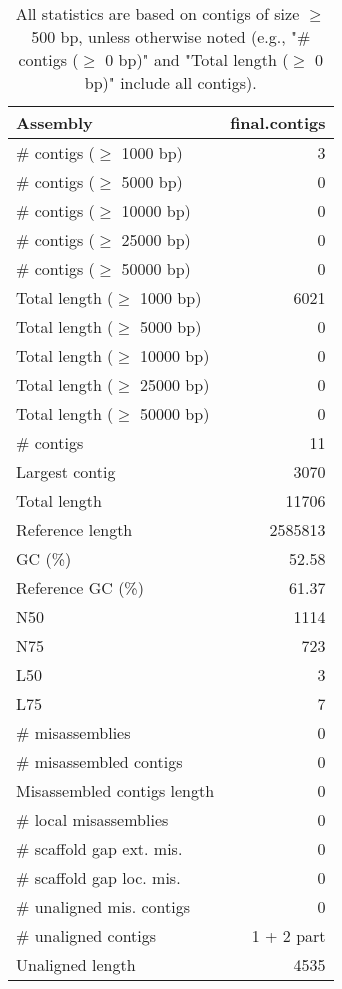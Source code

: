 \documentclass[12pt,a4paper]{article}
\begin{document}
\begin{table}[ht]
\begin{center}
\caption{All statistics are based on contigs of size $\geq$ 500 bp, unless otherwise noted (e.g., "\# contigs ($\geq$ 0 bp)" and "Total length ($\geq$ 0 bp)" include all contigs).}
\begin{tabular}{|l*{1}{|r}|}
\hline
Assembly & final.contigs \\ \hline
\# contigs ($\geq$ 1000 bp) & 3 \\ \hline
\# contigs ($\geq$ 5000 bp) & 0 \\ \hline
\# contigs ($\geq$ 10000 bp) & 0 \\ \hline
\# contigs ($\geq$ 25000 bp) & 0 \\ \hline
\# contigs ($\geq$ 50000 bp) & 0 \\ \hline
Total length ($\geq$ 1000 bp) & 6021 \\ \hline
Total length ($\geq$ 5000 bp) & 0 \\ \hline
Total length ($\geq$ 10000 bp) & 0 \\ \hline
Total length ($\geq$ 25000 bp) & 0 \\ \hline
Total length ($\geq$ 50000 bp) & 0 \\ \hline
\# contigs & 11 \\ \hline
Largest contig & 3070 \\ \hline
Total length & 11706 \\ \hline
Reference length & 2585813 \\ \hline
GC (\%) & 52.58 \\ \hline
Reference GC (\%) & 61.37 \\ \hline
N50 & 1114 \\ \hline
N75 & 723 \\ \hline
L50 & 3 \\ \hline
L75 & 7 \\ \hline
\# misassemblies & 0 \\ \hline
\# misassembled contigs & 0 \\ \hline
Misassembled contigs length & 0 \\ \hline
\# local misassemblies & 0 \\ \hline
\# scaffold gap ext. mis. & 0 \\ \hline
\# scaffold gap loc. mis. & 0 \\ \hline
\# unaligned mis. contigs & 0 \\ \hline
\# unaligned contigs & 1 + 2 part \\ \hline
Unaligned length & 4535 \\ \hline

\end{tabular}
\end{center}
\end{table}
\end{document}
